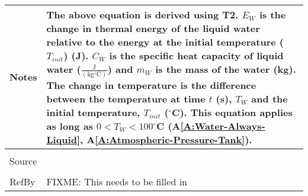 \documentclass[12pt]{article}
\begin{document}
\begin{minipage}{\textwidth}
\begin{tabular}{p{} p{}}
Notes & The above equation is derived using T2. ${E_{W}}$ is the change in thermal energy of the liquid water relative to the energy at the initial temperature (${T_{init}}$) (J). ${C_{W}}$ is the specific heat capacity of liquid water ($\frac{\text{J}}{(\text{kg}{}^{\circ}\text{C})}$) and ${m_{W}}$ is the mass of the water (kg). The change in temperature is the difference between the temperature at time $t$ (s), ${T_{W}}$ and the initial temperature, ${T_{init}}$ (${}^{\circ}$C). This equation applies as long as $0<{T_{W}}<100$${}^{\circ}$C (A\ref{A:Water-Always-Liquid}, A\ref{A:Atmospheric-Pressure-Tank}).
\\ \midrule \\
Source & 
\\ \midrule \\
RefBy & FIXME: This needs to be filled in
\\ \bottomrule \end{tabular}
\end{minipage}\\
\end{document}
